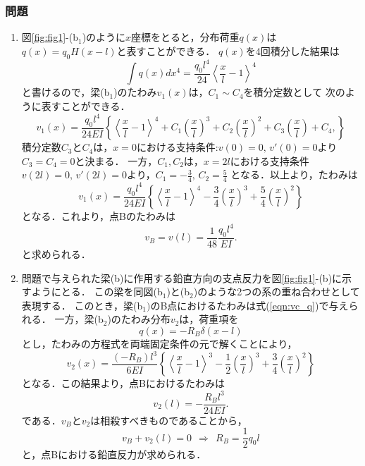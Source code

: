 \documentclass[10pt,a4j]{jarticle}
\begin{document}
\subsubsection*{問題}
\begin{enumerate}
\item
図\ref{fig:fig1}-(b$_1$)のように$x$座標をとると，分布荷重$q(x)$は
$q(x)=q_0H\left(x-l\right)$と表すことができる．
$q(x)$を4回積分した結果は
\begin{equation}
	\int q(x) dx^4
	= 
	\frac{q_0l^4}{24}
	\left< \frac{x}{l} -1\right> ^4
\end{equation}
と書けるので，梁(b$_1$)のたわみ$v_1(x)$は，$C_1\sim C_4$を積分定数として
次のように表すことができる．
	\begin{equation}
	v_1(x)=\frac{q_0l^4}{24EI}\left\{
		\left< \frac{x}{l} -1 \right> ^4
		+
		C_1
		\left(\frac{x}{l} \right)^3
		+
		C_2
		\left(\frac{x}{l} \right)^2
		+
		C_3
		\left(\frac{x}{l} \right)
		+
		C_4,
	\right\}
	\end{equation}
積分定数$C_3$と$C_4$は，$x=0$における支持条件:$v(0)=0,\, v'(0)=0$より$C_3=C_4=0$と決まる．
一方，$C_1,C_2$は，$x=2l$における支持条件
$v(2l)=0,\, v'(2l)=0$より，$C_1=-\frac{3}{4},\, C_2=\frac{5}{4}$
となる．以上より，たわみは
	\begin{equation}
	v_1(x)=\frac{q_0l^4}{24EI}\left\{
		\left< \frac{x}{l} -1\right> ^4
		-
		\frac{3}{4}
		\left(\frac{x}{l} \right)^3
		+
		\frac{5}{4}
		\left(\frac{x}{l} \right)^2
	\right\}
	\label{eqn:vx1}
	\end{equation}
となる．これより，点Bのたわみは
\begin{equation}
	v_B=v\left( l \right) 
	= \frac{1}{48}\frac{q_0l^4}{EI}.
	\label{eqn:vc_q}
\end{equation}
と求められる．
\item
問題で与えられた梁(b)に作用する鉛直方向の支点反力を図\ref{fig:fig1}-(b)に示すようにとる．
この梁を同図(b$_1$)と(b$_2$)のような2つの系の重ね合わせとして表現する．
このとき，梁(b$_1)$のB点におけるたわみは式(\ref{eqn:vc_q})で与えられる．
一方，梁(b$_2$)のたわみ分布$v_2$は，荷重項を
\begin{equation}
	q(x)=-R_B\delta\left(x-l\right)
\end{equation}
とし，たわみの方程式を両端固定条件の元で解くことにより，
\begin{equation}
	v_2(x)=\frac{(-R_B)l^3}{6EI}\left\{
		\left< \frac{x}{l}-1\right>^3
		-
		\frac{1}{2}
		\left(\frac{x}{l} \right)^3
		+
		\frac{3}{4}
		\left(\frac{x}{l} \right)^2
	\right\}
	\label{eqn:vx2}
\end{equation}
となる．この結果より，点Bにおけるたわみは
\begin{equation}
	v_2\left( l \right) 
	= -\frac{R_Bl^3}{24EI}.
	\label{eqn:vc_P}
\end{equation}
である．$v_B$と$v_2$は相殺すべきものであることから，
\begin{equation}
	v_B+v_2(l)=0 \ \ \Rightarrow \ \ R_B=\frac{1}{2}q_0l
	\label{eqn:RB}
\end{equation}
と，点Bにおける鉛直反力が求められる．\\


\end{enumerate}
\end{document}
